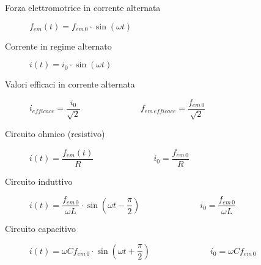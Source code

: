 \documentclass[a4paper,11pt,italian]{article}
\begin{document}
\begin{description}
  \item[Forza elettromotrice in corrente alternata]
  $ f_{em} (t)  = f_{em \, 0} \cdot \sin (\omega t) $
  
  \item[Corrente in regime alternato]
  $ i (t)  = i_0 \cdot \sin (\omega t) $
  
  \item[Valori efficaci in corrente alternata]  $ i_{\mathit{efficace}} = \dfrac{i_0}{\sqrt{2}} $~~~~~~~~~~~~~~$ f_{em \, \mathit{efficace}} = \dfrac{f_{em \, 0}}{\sqrt{2}} $
  
  \item[Circuito ohmico (resistivo)] 
  $ i(t) = \dfrac{f_{em} (t)}{R} $~~~~~~~~~~~~~~$ i_0 = \dfrac{f_{em \, 0}}{R} $

%   
  \item[Circuito induttivo] $ i(t) = \dfrac{f_{em \, 0}}{\omega L} \cdot \sin\left( \omega t - \dfrac{\pi}{2} \right) $~~~~~~~~~~~~~~$ i_0 = \dfrac{f_{em \, 0}}{\omega L} $
%

  \item[Circuito capacitivo] $ i(t) = \omega  C f_{em \, 0} \cdot \sin\left( \omega t + \dfrac{\pi}{2} \right) $~~~~~~~~~~~~~~$ i_0 = \omega  C f_{em \, 0} $
%   


\end{description}
\end{document}
